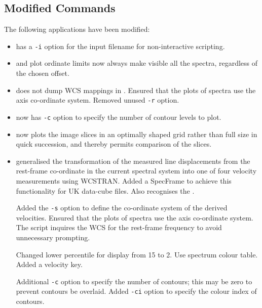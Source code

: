 \documentclass[twoside,11pt,nolof]{starlink}
\begin{document}
\subsection{Modified Commands}
The following applications have been modified:

\begin{itemize}

\item {} has a \texttt{-i} option for the
input filename for non-interactive scripting.

\item {} and
 plot ordinate limits now always
make visible all the spectra, regardless of the chosen offset.

\item {} does not dump WCS mappings
in .  Ensured that the plots of spectra
use the axis co-ordinate system.  Removed unused \texttt{-r} option.

\item {} now has \texttt{-c} option to
specify the number of contour levels to plot.

\item {} now plots the image slices in an
optimally shaped grid rather than full size in quick succession, and
thereby permits comparison of the slices.

\item {} generalised the transformation of the
measured line displacements from the rest-frame co-ordinate in the
current spectral system into one of four velocity measurements using
WCSTRAN.  Added a SpecFrame to achieve this functionality for
UK data-cube files.  Also recognises the
.

Added the \texttt{-s} option to define the co-ordinate system of the
derived velocities.  Ensured that the plots of spectra use the axis
co-ordinate system.  The script inquires the WCS for the rest-frame
frequency to avoid unnecessary prompting.

Changed lower percentile for display from 15 to 2.  Use spectrum
colour table.  Added a velocity key.

Additional \texttt{-c} option to specify the number of contours; this may
be zero to prevent contours be overlaid.  Added \texttt{-ci} option to
specify the colour index of contours.

\end{itemize}
\end{document}
